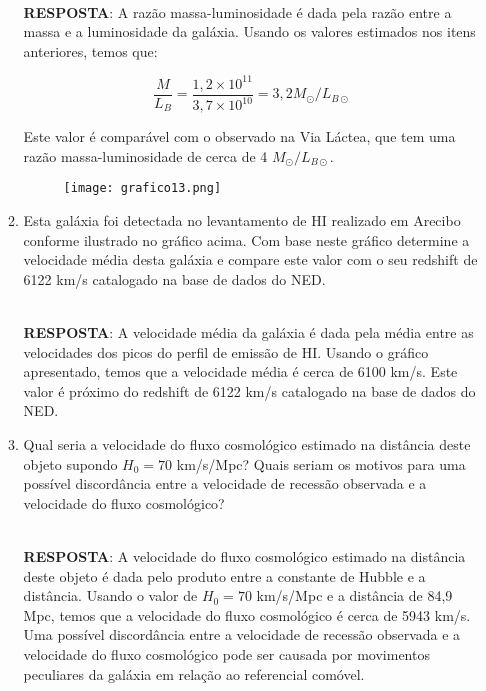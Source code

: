 \documentclass[a4paper,12pt]{article}
\begin{document}
\begin{enumerate}
\begin{enumerate}
\noindent\hrulefill\\\textbf{RESPOSTA}: A razão massa-luminosidade é dada pela razão entre a massa e a luminosidade da galáxia. Usando os valores estimados nos itens anteriores, temos que:

$$\frac{M}{L_B} = \frac{1,2 \times 10^{11}}{3,7 \times 10^{10}} = 3,2 M_{\odot}/L_{B\odot}$$

Este valor é comparável com o observado na Via Láctea, que tem uma razão massa-luminosidade de cerca de 4 $M_{\odot}/L_{B\odot}$.

\noindent\hrulefill

\begin{figure}[H]
\centering
\texttt{[image: grafico13.png]}
\end{figure}

\item Esta galáxia foi detectada no levantamento de HI realizado em Arecibo conforme ilustrado no gráfico acima. Com base neste gráfico determine a velocidade média desta galáxia e compare este valor com o seu redshift de 6122 km/s catalogado na base de dados do NED.

\noindent\hrulefill\\\textbf{RESPOSTA}: A velocidade média da galáxia é dada pela média entre as velocidades dos picos do perfil de emissão de HI. Usando o gráfico apresentado, temos que a velocidade média é cerca de 6100 km/s. Este valor é próximo do redshift de 6122 km/s catalogado na base de dados do NED.

\noindent\hrulefill

\item Qual seria a velocidade do fluxo cosmológico estimado na distância deste objeto supondo $H_0=70$ km/s/Mpc? Quais seriam os motivos para uma possível discordância entre a velocidade de recessão observada e a velocidade do fluxo cosmológico?

\noindent\hrulefill\\\textbf{RESPOSTA}: A velocidade do fluxo cosmológico estimado na distância deste objeto é dada pelo produto entre a constante de Hubble e a distância. Usando o valor de $H_0=70$ km/s/Mpc e a distância de 84,9 Mpc, temos que a velocidade do fluxo cosmológico é cerca de 5943 km/s. Uma possível discordância entre a velocidade de recessão observada e a velocidade do fluxo cosmológico pode ser causada por movimentos peculiares da galáxia em relação ao referencial comóvel.

\noindent\hrulefill


\end{enumerate}
\end{enumerate}
\end{document}
